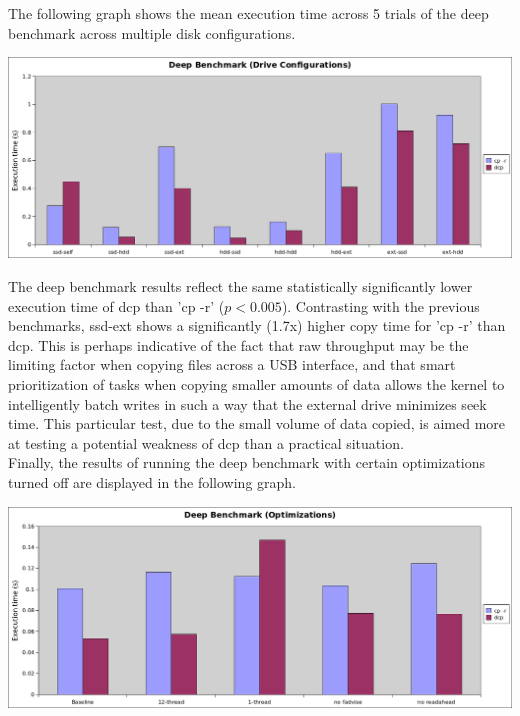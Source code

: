 \documentclass[12pt]{article}
\begin{document}
\noindent
The following graph shows the mean execution time across 5 trials of the deep benchmark across multiple disk configurations. \\

\vspace{5mm}

\includegraphics[width=500pt]{report/graphs/deep-manydisk.png}

\vspace{5mm}

The deep benchmark results reflect the same statistically significantly lower
execution time of dcp than 'cp -r' ($p < 0.005$). Contrasting with the previous
benchmarks, ssd-ext shows a significantly (1.7x) higher copy time for 'cp -r' than
dcp. This is perhaps indicative of the fact that raw throughput may be the limiting
factor when copying files across a USB interface, and that smart prioritization of
tasks when copying smaller amounts of data allows the kernel to intelligently
batch writes in such a way that the external drive minimizes seek time. This particular
test, due to the small volume of data copied, is aimed more at testing a potential weakness
of dcp than a practical situation. \\

Finally, the results of running the deep benchmark with certain optimizations turned off
are displayed in the following graph.\\

\vspace{5mm}

\includegraphics[width=500pt]{report/graphs/deep-optimizations.png}
\end{document}
